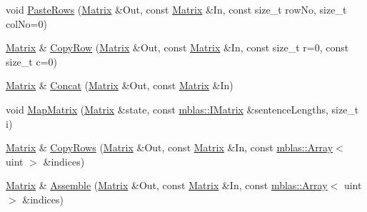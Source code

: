 \begin{DoxyCompactItemize}
\item 
void \hyperlink{namespaceamunmt_1_1GPU_1_1mblas_aea9adf68efb5a26cb9bca66189c1786c}{Paste\+Rows} (\hyperlink{namespaceamunmt_1_1GPU_1_1mblas_ab67821a8254de53e45a623cf73c0aef6}{Matrix} \&Out, const \hyperlink{namespaceamunmt_1_1GPU_1_1mblas_ab67821a8254de53e45a623cf73c0aef6}{Matrix} \&In, const size\+\_\+t row\+No, size\+\_\+t col\+No=0)
\item 
\hyperlink{namespaceamunmt_1_1GPU_1_1mblas_ab67821a8254de53e45a623cf73c0aef6}{Matrix} \& \hyperlink{namespaceamunmt_1_1GPU_1_1mblas_a4cbcf6af0265debf12e8348d2eea6daa}{Copy\+Row} (\hyperlink{namespaceamunmt_1_1GPU_1_1mblas_ab67821a8254de53e45a623cf73c0aef6}{Matrix} \&Out, const \hyperlink{namespaceamunmt_1_1GPU_1_1mblas_ab67821a8254de53e45a623cf73c0aef6}{Matrix} \&In, const size\+\_\+t r=0, const size\+\_\+t c=0)
\item 
\hyperlink{namespaceamunmt_1_1GPU_1_1mblas_ab67821a8254de53e45a623cf73c0aef6}{Matrix} \& \hyperlink{namespaceamunmt_1_1GPU_1_1mblas_af345694ea7f81e67d44c906d2a24b4a9}{Concat} (\hyperlink{namespaceamunmt_1_1GPU_1_1mblas_ab67821a8254de53e45a623cf73c0aef6}{Matrix} \&Out, const \hyperlink{namespaceamunmt_1_1GPU_1_1mblas_ab67821a8254de53e45a623cf73c0aef6}{Matrix} \&In)
\item 
void \hyperlink{namespaceamunmt_1_1GPU_1_1mblas_ac4634f9a58b95ccdd997393c75a9fc69}{Map\+Matrix} (\hyperlink{namespaceamunmt_1_1GPU_1_1mblas_ab67821a8254de53e45a623cf73c0aef6}{Matrix} \&state, const \hyperlink{namespaceamunmt_1_1GPU_1_1mblas_ad6a337d269d1833a6028b8871e57d2d0}{mblas\+::\+I\+Matrix} \&sentence\+Lengths, size\+\_\+t i)
\item 
\hyperlink{namespaceamunmt_1_1GPU_1_1mblas_ab67821a8254de53e45a623cf73c0aef6}{Matrix} \& \hyperlink{namespaceamunmt_1_1GPU_1_1mblas_ab9e2664595a60723ce6158c22f2ed527}{Copy\+Rows} (\hyperlink{namespaceamunmt_1_1GPU_1_1mblas_ab67821a8254de53e45a623cf73c0aef6}{Matrix} \&Out, const \hyperlink{namespaceamunmt_1_1GPU_1_1mblas_ab67821a8254de53e45a623cf73c0aef6}{Matrix} \&In, const \hyperlink{classamunmt_1_1GPU_1_1mblas_1_1Array}{mblas\+::\+Array}$<$ uint $>$ \&indices)
\item 
\hyperlink{namespaceamunmt_1_1GPU_1_1mblas_ab67821a8254de53e45a623cf73c0aef6}{Matrix} \& \hyperlink{namespaceamunmt_1_1GPU_1_1mblas_a45e67b812840551fae28c4f7cca2b562}{Assemble} (\hyperlink{namespaceamunmt_1_1GPU_1_1mblas_ab67821a8254de53e45a623cf73c0aef6}{Matrix} \&Out, const \hyperlink{namespaceamunmt_1_1GPU_1_1mblas_ab67821a8254de53e45a623cf73c0aef6}{Matrix} \&In, const \hyperlink{classamunmt_1_1GPU_1_1mblas_1_1Array}{mblas\+::\+Array}$<$ uint $>$ \&indices)

\end{DoxyCompactItemize}
